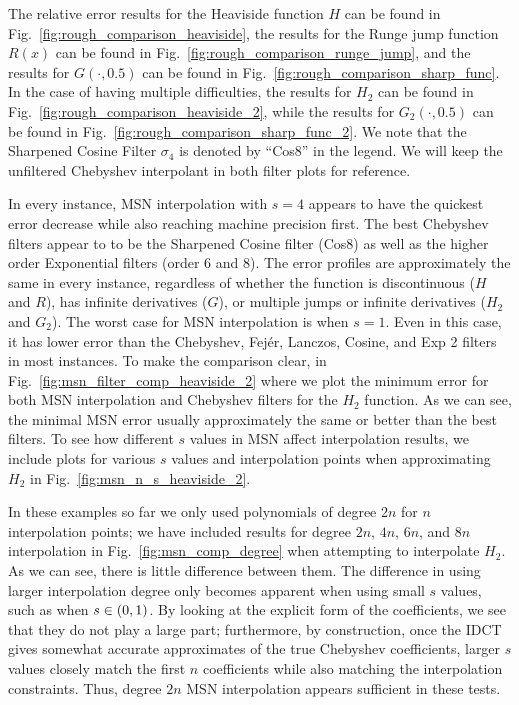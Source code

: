 The relative error results for the Heaviside function $H$ can be found in
Fig.~\ref{fig:rough_comparison_heaviside},
the results for the Runge jump function $R(x)$ can be found in
Fig.~\ref{fig:rough_comparison_runge_jump}, and
the results for $G(\cdot,0.5)$ can be found in
Fig.~\ref{fig:rough_comparison_sharp_func}.
In the case of having multiple difficulties, 
the results for $H_{2}$ can be found in
Fig.~\ref{fig:rough_comparison_heaviside_2}, while
the results for $G_{2}(\cdot,0.5)$ can be found in
Fig.~\ref{fig:rough_comparison_sharp_func_2}.
We note that the Sharpened Cosine Filter $\sigma_{4}$ is denoted
by ``Cos8'' in the legend.
We will keep the unfiltered Chebyshev interpolant in both filter plots
for reference.

In every instance, MSN interpolation with $s=4$ appears to have the
quickest error decrease while also reaching machine precision first.
The best Chebyshev filters appear to to be the Sharpened Cosine filter (Cos8)
as well as the higher order Exponential filters (order 6 and 8).
The error profiles are approximately the same in every instance,
regardless of whether the function is discontinuous ($H$ and $R$),
has infinite derivatives ($G$), or multiple jumps or infinite derivatives
($H_{2}$ and $G_{2}$).
The worst case for MSN interpolation is when $s=1$.
Even in this case, it has lower error than the Chebyshev,
Fej\'{e}r, Lanczos, Cosine, and Exp 2 filters in most instances.
To make the comparison clear, in Fig.~\ref{fig:msn_filter_comp_heaviside_2}
where we plot the minimum error for both MSN interpolation
and Chebyshev filters for the $H_{2}$ function.
As we can see, the minimal MSN error usually approximately the same or better
than the best filters.
To see how different $s$ values in MSN affect interpolation
results, we include plots for various $s$ values and interpolation
points when approximating $H_{2}$ in Fig.~\ref{fig:msn_n_s_heaviside_2}.

In these examples so far we only used polynomials of degree $2n$
for $n$ interpolation points; we have included results for
degree $2n$, $4n$, $6n$, and $8n$ interpolation
in Fig.~\ref{fig:msn_comp_degree} when attempting to interpolate $H_{2}$.
As we can see, there is little difference between them.
The difference in using larger interpolation degree only becomes
apparent when using small $s$ values, such as when $s\in\left( 0,1 \right)$.
By looking at the explicit form of the coefficients, we see
that they do not play a large part; furthermore, by construction,
once the IDCT gives somewhat accurate approximates of the true
Chebyshev coefficients, larger $s$ values closely match the
first $n$ coefficients while also matching the interpolation constraints.
Thus, degree $2n$ MSN interpolation appears sufficient in these tests.

